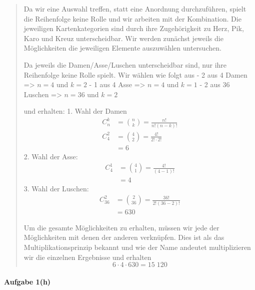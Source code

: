 \documentclass[
]{article}
\begin{document}
\begin{quote}
Da wir eine Auswahl treffen, statt eine Anordnung durchzuführen, spielt
die Reihenfolge keine Rolle und wir arbeiten mit der Kombination. Die
jeweiligen Kartenkategorien sind durch ihre Zugehörigkeit zu Herz, Pik,
Karo und Kreuz unterscheidbar. Wir werden zunächst jeweils die
Möglichkeiten die jeweiligen Elemente auszuwählen untersuchen.

Da jeweils die Damen/Asse/Luschen unterscheidbar sind, nur ihre
Reihenfolge keine Rolle spielt. Wir wählen wie folgt aus - 2 aus 4 Damen
=\textgreater{} \(n=4\) und \(k=2\) - 1 aus 4 Asse =\textgreater{}
\(n=4\) und \(k=1\) - 2 aus 36 Luschen =\textgreater{} \(n=36\) und
\(k=2\)

und erhalten: 1. Wahl der Damen \[\begin{align}
C^k_{n} &= \binom{n}{k} = \frac{n!}{n!(n-k)!} \\
C^2_{4} &= \binom{4}{2} = \frac{4!}{2!\cdot2!} \\
    &= 6
\end{align}\] 2. Wahl der Asse: \[\begin{align}
C^1_{4} &= \binom{4}{1} = \frac{4!}{(4-1)!} \\
&=4
\end{align}\] 3. Wahl der Luschen: \[\begin{align}
 C^2_{36} &= \binom{2}{36} = \frac{36!}{2!(36-2)!} \\
&= 630
\end{align}\]

Um die gesamte Möglichkeiten zu erhalten, müssen wir jede der
Möglichkeiten mit denen der anderen verknüpfen. Dies ist als das
Multiplikationsprinzip bekannt und wie der Name andeutet multiplizieren
wir die einzelnen Ergebnisse und erhalten
\[6 \cdot 4 \cdot 630 = 15\;120\]
\end{quote}

\paragraph{Aufgabe 1(h)}\label{aufgabe-1h}
\end{document}
